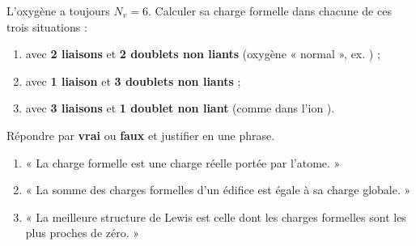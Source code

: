 \documentclass[11pt,a4paper]{article}
\begin{document}
\begin{exo}
L'oxygène a toujours $N_v = 6$. Calculer sa charge formelle dans chacune de ces trois situations :
\begin{enumerate}[label=\alph*),leftmargin=2em,itemsep=1pt]
  \item {} avec \textbf{2 liaisons} et \textbf{2 doublets non liants} (oxygène « normal », ex. ) ;
  \item {} avec \textbf{1 liaison} et \textbf{3 doublets non liants} ;
  \item {} avec \textbf{3 liaisons} et \textbf{1 doublet non liant} (comme dans l'ion ).
\end{enumerate}
\end{exo}

\begin{exo}
Répondre par \textbf{vrai} ou \textbf{faux} et justifier en une phrase.
\begin{enumerate}[label=\alph*),leftmargin=2em,itemsep=1pt]
  \item « La charge formelle est une charge réelle portée par l'atome. »
  \item « La somme des charges formelles d'un édifice est égale à sa charge globale. »
  \item « La meilleure structure de Lewis est celle dont les charges formelles sont les plus proches de zéro. »
\end{enumerate}
\end{exo}
\end{document}
